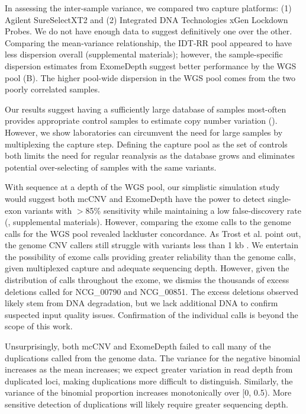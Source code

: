\documentclass{bmcart}\usepackage[]{graphicx}\usepackage[]{color}
\begin{document}
In assessing the inter-sample variance, we compared two capture platforms: (1) Agilent SureSelectXT2 and (2) Integrated DNA Technologies xGen Lockdown Probes.
We do not have enough data to suggest definitively one over the other.
Comparing the mean-variance relationship, the IDT-RR pool appeared to have less dispersion overall (supplemental materials); however, the sample-specific dispersion estimates from ExomeDepth suggest better performance by the WGS pool (B).
The higher pool-wide dispersion in the WGS pool comes from the two poorly correlated samples.

Our results suggest having a sufficiently large database of samples most-often provides appropriate control samples to estimate copy number variation ().
However, we show laboratories can circumvent the need for large samples by multiplexing the capture step.
Defining the capture pool as the set of controls both limits the need for regular reanalysis as the database grows and eliminates potential over-selecting of samples with the same variants.

With sequence at a depth of the WGS pool, our simplistic simulation study would suggest both mcCNV and ExomeDepth have the power to detect single-exon variants with $>$85\% sensitivity while maintaining a low false-discovery rate (, supplemental materials).
However, comparing the exome calls to the genome calls for the WGS pool revealed lackluster concordance.
As Trost et al. point out, the genome CNV callers still struggle with variants less than 1 kb \cite{trost:2018aa}.
We entertain the possibility of exome calls providing greater reliability than the genome calls, given multiplexed capture and adequate sequencing depth.
However, given the distribution of calls throughout the exome, we dismiss the thousands of excess deletions called for NCG\_00790 and NCG\_00851.
The excess deletions observed likely stem from DNA degradation, but we lack additional DNA to confirm suspected input quality issues.
Confirmation of the individual calls is beyond the scope of this work.

Unsurprisingly, both mcCNV and ExomeDepth failed to call many of the duplications called from the genome data.
The variance for the negative binomial increases as the mean increases; we expect greater variation in read depth from duplicated loci, making duplications more difficult to distinguish.
Similarly, the variance of the binomial proportion increases monotonically over [0, 0.5).
More sensitive detection of duplications will likely require greater sequencing depth.
\end{document}
